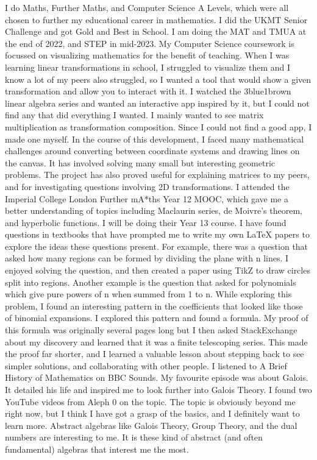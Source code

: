 \documentclass[a4paper, 12pt]{article}
\newenvironment{personalstatement}{\directlua{startPersonalStatement()}}{\directlua{stopPersonalStatement()}}
\begin{document}
\begin{personalstatement}
I do Maths, Further Maths, and Computer Science A Levels, which were all chosen to further my educational career in mathematics. I did the UKMT Senior Challenge and got Gold and Best in School. I am doing the MAT and TMUA at the end of 2022, and STEP in mid-2023.
My Computer Science coursework is focussed on visualizing mathematics for the benefit of teaching. When I was learning linear transformations in school, I struggled to visualize them and I know a lot of my peers also struggled, so I wanted a tool that would show a given transformation and allow you to interact with it. I watched the 3blue1brown linear algebra series and wanted an interactive app inspired by it, but I could not find any that did everything I wanted. I mainly wanted to see matrix multiplication as transformation composition. Since I could not find a good app, I made one myself. In the course of this development, I faced many mathematical challenges around converting between coordinate systems and drawing lines on the canvas. It has involved solving many small but interesting geometric problems. The project has also proved useful for explaining matrices to my peers, and for investigating questions involving 2D transformations.
I attended the Imperial College London Further mA*ths Year 12 MOOC, which gave me a better understanding of topics including Maclaurin series, de Moivre's theorem, and hyperbolic functions. I will be doing their Year 13 course.
I have found questions in textbooks that have prompted me to write my own LaTeX papers to explore the ideas these questions present. For example, there was a question that asked how many regions can be formed by dividing the plane with n lines. I enjoyed solving the question, and then created a paper using TikZ to draw circles split into regions. Another example is the question that asked for polynomials which give pure powers of n when summed from 1 to n. While exploring this problem, I found an interesting pattern in the coefficients that looked like those of binomial expansions. I explored this pattern and found a formula. My proof of this formula was originally several pages long but I then asked StackExchange about my discovery and learned that it was a finite telescoping series. This made the proof far shorter, and I learned a valuable lesson about stepping back to see simpler solutions, and collaborating with other people.
I listened to A Brief History of Mathematics on BBC Sounds. My favourite episode was about Galois. It detailed his life and inspired me to look further into Galois Theory. I found two YouTube videos from Aleph 0 on the topic. The topic is obviously beyond me right now, but I think I have got a grasp of the basics, and I definitely want to learn more. Abstract algebras like Galois Theory, Group Theory, and the dual numbers are interesting to me. It is these kind of abstract (and often fundamental) algebras that interest me the most.

\end{personalstatement}
\end{document}
